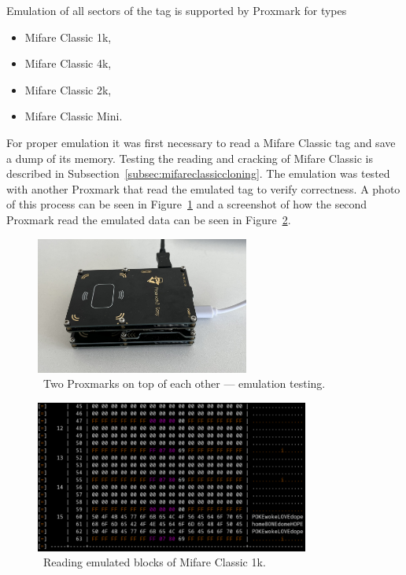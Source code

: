 Emulation of all sectors of the tag is supported by Proxmark for types

\begin{itemize}
    \item Mifare Classic 1k,
    \item Mifare Classic 4k,
    \item Mifare Classic 2k,
    \item Mifare Classic Mini.
\end{itemize}

For proper emulation it was first necessary to read a Mifare Classic tag and save a dump of its memory. Testing the reading and cracking of Mifare Classic is described in Subsection~\ref{subsec:mifareclassiccloning}. The emulation was tested with another Proxmark that read the emulated tag to verify correctness. A photo of this process can be seen in Figure~\ref{fig:proxmarkemulatingtesting} and a screenshot of how the second Proxmark read the emulated data can be seen in Figure~\ref{fig:emulatedblocksclassic}.

\begin{figure}[ht]
  \centering
  \includegraphics[width=7cm]{text/testing/two_proxmarks.JPEG}
  \caption{~Two Proxmarks on top of each other --- emulation testing.}
  \label{fig:proxmarkemulatingtesting}
\end{figure}

\begin{figure}[ht]
  \centering
  \includegraphics[width=9cm]{text/testing/whole_mf_classic_4k.png}
  \caption{~Reading emulated blocks of Mifare Classic 1k.}
  \label{fig:emulatedblocksclassic}
\end{figure}

